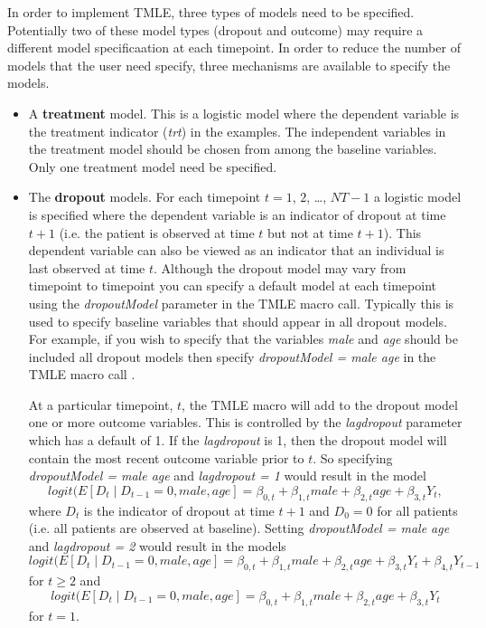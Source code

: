 \documentclass[10pt]{article}
\begin{document}
In order to implement TMLE, three types of models need to be specified.  Potentially two of these model types (dropout and outcome) may require a different model specificaation at each timepoint.  In order to reduce the number of models that the user need specify, three mechanisms are available to specify the models.
\begin{itemize}
\item A {\bf treatment} model.
      This is a logistic model where the dependent variable is the treatment indicator ({\em trt}) in the examples.  The independent variables in the treatment model should be chosen from among the baseline variables.  Only one treatment model need be specified.
\item The {\bf dropout} models.
      For each timepoint $t=1$, $2$, \ldots, $NT - 1$ a logistic model is specified where the dependent variable is an indicator of dropout at time $t+1$ (i.e. the patient is observed at time $t$ but not at time $t+1$).  This dependent variable can also be viewed as an indicator that an individual is last observed at time $t$.  Although the dropout model may vary from timepoint to timepoint you can specify a default model at each timepoint using the {\em dropoutModel} parameter in the TMLE macro call.  Typically this is used to specify baseline variables that should appear in all dropout models.   For example, if you wish to specify that the variables {\em male} and {\em age} should be included all dropout models then specify {\em dropoutModel = male age} in the TMLE macro call . 


At a particular timepoint, $t$, the TMLE macro will add to the dropout model one or more outcome variables.  This is controlled by the {\em lagdropout} parameter which has a default of 1.   If the {\em lagdropout} is 1, then the dropout model will contain the most recent outcome variable prior to $t$.  So specifying {\em dropoutModel = male age} and {\em lagdropout = 1} would result in the model 
$$ logit( E[ D_{t} \mid D_{t-1} = 0, male, age ] = \beta_{0,t} + \beta_{1,t} male + \beta_{2,t} age + \beta_{3,t} Y_t,$$ where $D_t$ is the indicator of dropout at time $t+1$ and $D_0 = 0$ for all patients (i.e. all patients are observed at baseline).
Setting {\em dropoutModel = male age} and {\em lagdropout = 2} would result in the models 
$$ logit( E[ D_{t} \mid D_{t-1} = 0, male, age ] = \beta_{0,t} + \beta_{1,t} male + \beta_{2,t} age + \beta_{3,t} Y_t + \beta_{4,t} Y_{t-1}$$
for $t \ge  2$ and  
$$ logit( E[ D_{t} \mid D_{t-1} = 0, male, age ] = \beta_{0,t} + \beta_{1,t} male + \beta_{2,t} age + \beta_{3,t} Y_t$$
for $t = 1$.


\end{itemize}
\end{document}
